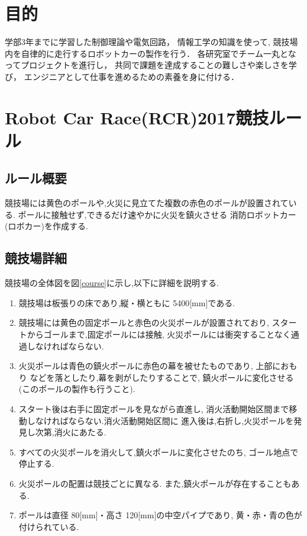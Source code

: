 \documentclass[10pt,a4j]{jarticle}
\begin{document}



\newpage
\section{目的}
学部3年までに学習した制御理論や電気回路，
情報工学の知識を使って, 競技場内を自律的に走行するロボットカーの製作を行う．
各研究室でチーム一丸となってプロジェクトを進行し，
共同で課題を達成することの難しさや楽しさを学び，
エンジニアとして仕事を進めるための素養を身に付ける．


\section{Robot Car Race(RCR)2017競技ルール}
\subsection{ルール概要}
競技場には黄色のポールや,火災に見立てた複数の赤色のポールが設置されている.
ポールに接触せず,できるだけ速やかに火災を鎮火させる
消防ロボットカー(ロボカー)を作成する.

\subsection{競技場詳細}
競技場の全体図を図\ref{course}に示し,以下に詳細を説明する.
\begin{enumerate}
  \item 競技場は板張りの床であり,縦・横ともに 5400[mm]である.

  \item 競技場には黄色の固定ポールと赤色の火災ポールが設置されており,
        スタートからゴールまで,固定ポールには接触,
        火災ポールには衝突することなく通過しなければならない.

  \item 火災ポールは青色の鎮火ポールに赤色の幕を被せたものであり,
        上部におもり などを落としたり,幕を剥がしたりすることで,
        鎮火ポールに変化させる(このポールの製作も行うこと).

  \item スタート後は右手に固定ポールを見ながら直進し,
        消火活動開始区間まで移動しなければならない.消火活動開始区間に
        進入後は,右折し,火災ポールを発見し次第,消火にあたる.

  \item すべての火災ポールを消火して,鎮火ポールに変化させたのち,
        ゴール地点で停止する.

  \item 火災ポールの配置は競技ごとに異なる.
        また,鎮火ポールが存在することもある.

  \item ポールは直径 80[mm]・高さ 120[mm]の中空パイプであり,
        黄・赤・青の色が付けられている.
\end{enumerate}
\end{document}
